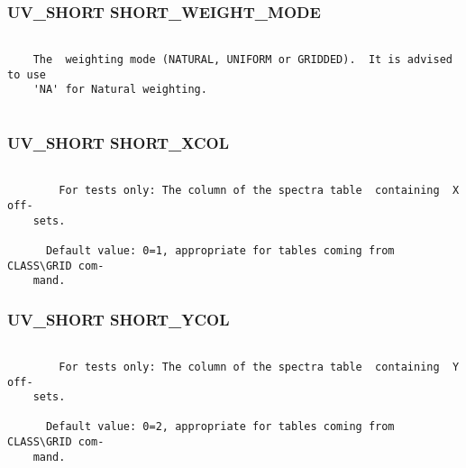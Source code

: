 \subsubsection{UV\_SHORT SHORT\_WEIGHT\_MODE}
\begin{verbatim}

    The  weighting mode (NATURAL, UNIFORM or GRIDDED).  It is advised to use
    'NA' for Natural weighting.


\end{verbatim}
\subsubsection{UV\_SHORT SHORT\_XCOL}
\begin{verbatim}

        For tests only: The column of the spectra table  containing  X  off-
    sets.

      Default value: 0=1, appropriate for tables coming from CLASS\GRID com-
    mand.

\end{verbatim}
\subsubsection{UV\_SHORT SHORT\_YCOL}
\begin{verbatim}

        For tests only: The column of the spectra table  containing  Y  off-
    sets.

      Default value: 0=2, appropriate for tables coming from CLASS\GRID com-
    mand.

\end{verbatim}
